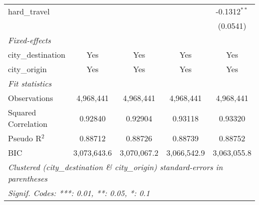 \begin{tabular}{lcccc}
   hard\_travel        &                &                 &                 & -0.1312$^{**}$\\   
                       &                &                 &                 & (0.0541)\\   
   \midrule
   \emph{Fixed-effects}\\
   city\_destination   & Yes            & Yes             & Yes             & Yes\\  
   city\_origin        & Yes            & Yes             & Yes             & Yes\\  
   \midrule
   \emph{Fit statistics}\\
   Observations        & 4,968,441      & 4,968,441       & 4,968,441       & 4,968,441\\  
   Squared Correlation & 0.92840        & 0.92904         & 0.93118         & 0.93320\\  
   Pseudo R$^2$        & 0.88712        & 0.88726         & 0.88739         & 0.88752\\  
   BIC                 & 3,073,643.6    & 3,070,067.2     & 3,066,542.9     & 3,063,055.8\\  
   \midrule \midrule
   \multicolumn{5}{l}{\emph{Clustered (city\_destination \& city\_origin) standard-errors in parentheses}}\\
   \multicolumn{5}{l}{\emph{Signif. Codes: ***: 0.01, **: 0.05, *: 0.1}}\\
\end{tabular}
\par\endgroup


